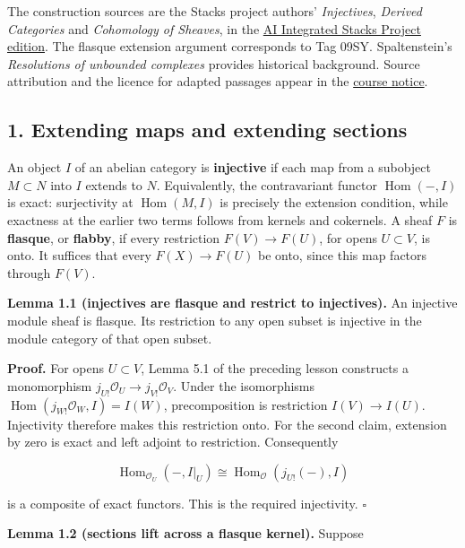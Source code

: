 \documentclass[
  english,
  11pt,
  a4paper,
]{article}
\begin{document}
The construction sources are the Stacks project authors'
\emph{Injectives}, \emph{Derived Categories} and \emph{Cohomology of
Sheaves}, in the
\href{https://github.com/KokunoYumeto/unofficial-stacks-project-ai-drafts/tree/565b10e987aba5969b21145a0833f42d69f96790}{AI
Integrated Stacks Project edition}. The flasque extension argument
corresponds to Tag 09SY. Spaltenstein's \emph{Resolutions of unbounded
complexes} provides historical background. Source attribution and the
licence for adapted passages appear in the
\hyperref[sources-and-authorship]{course notice}.

\subsection{1. Extending maps and extending
sections}\label{injective-modules-and-bounded-below-derived-functors--1-extending-maps-and-extending-sections}

An object \(I\) of an abelian category is \textbf{injective} if each map
from a subobject \(M\subset N\) into \(I\) extends to \(N\).
Equivalently, the contravariant functor \(\operatorname{Hom}(-,I)\) is
exact: surjectivity at \(\operatorname{Hom}(M,I)\) is precisely the
extension condition, while exactness at the earlier two terms follows
from kernels and cokernels. A sheaf \(F\) is \textbf{flasque}, or
\textbf{flabby}, if every restriction \(F(V)\to F(U)\), for opens
\(U\subset V\), is onto. It suffices that every \(F(X)\to F(U)\) be
onto, since this map factors through \(F(V)\).

\textbf{Lemma 1.1 (injectives are flasque and restrict to injectives).}
An injective module sheaf is flasque. Its restriction to any open subset
is injective in the module category of that open subset.

\textbf{Proof.} For opens \(U\subset V\), Lemma 5.1 of the preceding
lesson constructs a monomorphism
\(j_{U!}\mathcal O_U\to j_{V!}\mathcal O_V\). Under the isomorphisms
\(\operatorname{Hom}(j_{W!}\mathcal O_W,I)=I(W)\), precomposition is
restriction \(I(V)\to I(U)\). Injectivity therefore makes this
restriction onto. For the second claim, extension by zero is exact and
left adjoint to restriction. Consequently

\[\operatorname{Hom}_{\mathcal O_U}(-,I|_U)
\cong\operatorname{Hom}_{\mathcal O}(j_{U!}(-),I)\]

is a composite of exact functors. This is the required injectivity.
\(\square\)

\textbf{Lemma 1.2 (sections lift across a flasque kernel).} Suppose
\end{document}
